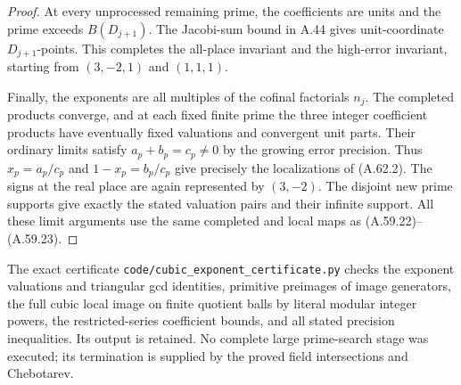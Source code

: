 \begin{proof}
At every unprocessed remaining prime,
the coefficients are units and the
prime exceeds $B(D_{j+1})$.
The Jacobi-sum bound in A.44 gives
unit-coordinate $D_{j+1}$-points.
This completes the all-place invariant
and the high-error invariant, starting
from $(3,-2,1)$ and $(1,1,1)$.

Finally, the exponents are all multiples
of the cofinal factorials $n_j$.
The completed products converge, and
at each fixed finite prime the three
integer coefficient products have
eventually fixed valuations and
convergent unit parts. Their ordinary
limits satisfy $a_p+b_p=c_p\ne0$
by the growing error precision.
Thus $x_p=a_p/c_p$ and $1-x_p=b_p/c_p$
give precisely the localizations of
(A.62.2). The signs at the real place
are again represented by $(3,-2)$.
The disjoint new prime supports give
exactly the stated valuation pairs
and their infinite support.
All these limit arguments use the
same completed and local maps as
(A.59.22)--(A.59.23).
\end{proof}

The exact certificate
\texttt{code/cubic\_exponent\_certificate.py}
checks the exponent valuations and triangular
gcd identities, primitive preimages of image
generators, the full cubic local image on
finite quotient balls by literal modular
integer powers, the restricted-series
coefficient bounds, and all stated precision
inequalities. Its output is retained.
No complete large prime-search stage was
executed; its termination is supplied by
the proved field intersections and Chebotarev.
